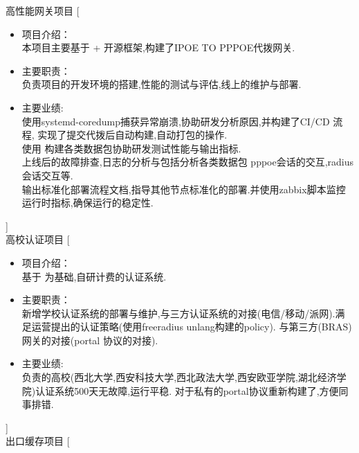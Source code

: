 \documentclass[zh]{resume}
\begin{document}
\begin{experiences}
  {高性能网关项目}%
  [\begin{itemize}
    \item 项目介绍：\\
    本项目主要基于 +  开源框架,构建了IPOE TO PPPOE代拨网关.
    \item 主要职责：\\
    负责项目的开发环境的搭建,性能的测试与评估,线上的维护与部署. 
    \item 主要业绩: \\
    使用systemd-coredump捕获异常崩溃,协助研发分析原因,并构建了CI/CD 流程, 实现了提交代拨后自动构建,自动打包的操作. \\
    使用  构建各类数据包协助研发测试性能与输出指标. \\
    上线后的故障排查,日志的分析与包括分析各类数据包 pppoe会话的交互,radius 会话交互等.\\
    输出标准化部署流程文档,指导其他节点标准化的部署.并使用zabbix脚本监控运行时指标,确保运行的稳定性. 
  \end{itemize}]
  \\
  \experience
  []%
  {}%
  {高校认证项目}%
  [\begin{itemize}
    \item 项目介绍：\\
    基于 为基础,自研计费的认证系统.
    \item 主要职责：\\
    新增学校认证系统的部署与维护,与三方认证系统的对接(电信/移动/派网).满足运营提出的认证策略(使用freeradius unlang构建的policy).
    与第三方(BRAS)网关的对接(portal 协议的对接).
    \item 主要业绩: \\
    负责的高校(西北大学,西安科技大学,西北政法大学,西安欧亚学院,湖北经济学院)认证系统500天无故障,运行平稳.
    对于私有的portal协议重新构建了,方便同事排错.
  \end{itemize}]
  \\
  \experience
  []%
  {}%
  {出口缓存项目}%
  [\begin{itemize}

\end{itemize}
\end{experiences}
\end{document}
